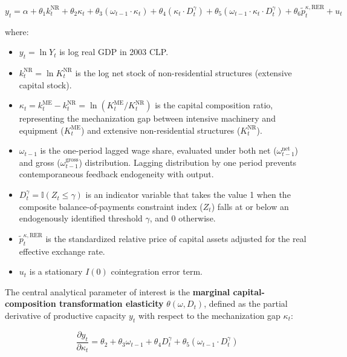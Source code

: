 \begin{equation}
y_t = \alpha + \theta_1 k_t^{\text{NR}} + \theta_2 \kappa_t + \theta_3 (\omega_{t-1} \cdot \kappa_t) + \theta_4 (\kappa_t \cdot D_t^{\gamma}) + \theta_5 (\omega_{t-1} \cdot \kappa_t \cdot D_t^{\gamma}) + \theta_6 \tilde{p}_t^{\kappa, \text{RER}} + u_t
\end{equation}

where:
\begin{itemize}
    \item $y_t = \ln Y_t$ is log real GDP in 2003 CLP.
    \item $k_t^{\text{NR}} = \ln K_t^{\text{NR}}$ is the log net stock of non-residential structures (extensive capital stock).
    \item $\kappa_t = k_t^{\text{ME}} - k_t^{\text{NR}} = \ln(K_t^{\text{ME}} / K_t^{\text{NR}})$ is the capital composition ratio, representing the mechanization gap between intensive machinery and equipment ($K_t^{\text{ME}}$) and extensive non-residential structures ($K_t^{\text{NR}}$).
    \item $\omega_{t-1}$ is the one-period lagged wage share, evaluated under both net ($\omega_{t-1}^{\text{net}}$) and gross ($\omega_{t-1}^{\text{gross}}$) distribution. Lagging distribution by one period prevents contemporaneous feedback endogeneity with output.
    \item $D_t^{\gamma} = \mathbb{I}(Z_t \le \gamma)$ is an indicator variable that takes the value 1 when the composite balance-of-payments constraint index ($Z_t$) falls at or below an endogenously identified threshold $\gamma$, and 0 otherwise.
    \item $\tilde{p}_t^{\kappa, \text{RER}}$ is the standardized relative price of capital assets adjusted for the real effective exchange rate.
    \item $u_t$ is a stationary $I(0)$ cointegration error term.
\end{itemize}

The central analytical parameter of interest is the \textbf{marginal capital-composition transformation elasticity} $\theta(\omega, D_t)$, defined as the partial derivative of productive capacity $y_t$ with respect to the mechanization gap $\kappa_t$:

\begin{equation}
\frac{\partial y_t}{\partial \kappa_t} = \theta_2 + \theta_3 \omega_{t-1} + \theta_4 D_t^{\gamma} + \theta_5 (\omega_{t-1} \cdot D_t^{\gamma})
\end{equation}

